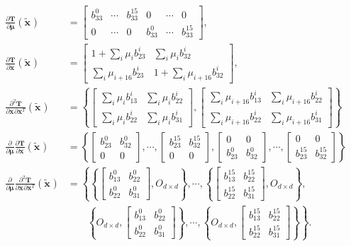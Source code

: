 \documentclass[]{article}
\newcommand{\vT}{\bm{T}}
\newcommand{\vmu}{\bm{\mu}}
\newcommand{\vx}[1][]{\bm{x}_{#1}}
\newcommand{\vxt}[1][]{\bm{\widetilde x}_{#1}}
\newcommand{\D}[2]{\frac{\partial #1}{\partial #2}}
\newcommand{\Dd}[3]{\frac{\partial^2 #1}{\partial #2 \partial #3}}
\begin{document}
\begin{align}
\D{\vT}{\vmu}(\vxt) &= \begin{bmatrix} b_{33}^{0} & \cdots &
b_{33}^{15} & 0 & \cdots & 0 \\ 0 & \cdots & 0 & b_{33}^{0} &
\cdots & b_{33}^{15} \end{bmatrix}, \\
\D{\vT}{\vx}(\vxt) &= \begin{bmatrix} 1 + \sum_i \mu_i b_{23}^i &
\sum_i \mu_i b_{32}^i \\ \sum_i \mu_{i+16} b_{23}^{i} & 1 + \sum_i
\mu_{i+16} b_{32}^{i} \end{bmatrix}, \\
\Dd{\vT}{\vx}{\vx^T}(\vxt) &= \left\{ \begin{bmatrix} \sum_i \mu_i
b_{13}^i & \sum_i \mu_i b_{22}^i \\ \sum_i \mu_{i} b_{22}^{i} &
\sum_i \mu_{i} b_{31}^{i} \end{bmatrix}, \begin{bmatrix} \sum_i
\mu_{i+16} b_{13}^{i} & \sum_i \mu_{i+16} b_{22}^{i} \\ \sum_i
\mu_{i+16} b_{22}^{i} & \sum_i \mu_{i+16} b_{31}^{i}
\end{bmatrix} \right\} \\
\D{}{\vmu} \D{\vT}{\vx}(\vxt) &= \left\{ \begin{bmatrix} b_{23}^{0}
& b_{32}^{0} \\ 0 & 0 \end{bmatrix}, \cdots, \begin{bmatrix}
b_{23}^{15} & b_{32}^{15} \\ 0 & 0 \end{bmatrix}, \begin{bmatrix} 0
& 0 \\ b_{23}^{0} & b_{32}^{0} \end{bmatrix}, \cdots,
\begin{bmatrix} 0 & 0 \\ b_{23}^{15} & b_{32}^{15} \end{bmatrix} \right\}
\\
\D{}{\vmu} \Dd{\vT}{\vx}{\vx^T}(\vxt) &= \left\{ \left\{
\begin{bmatrix} b_{13}^0 & b_{22}^0 \\ b_{22}^0 & b_{31}^0 \end{bmatrix},
O_{d \times d} \right\}, \cdots, \left\{ \begin{bmatrix} b_{13}^{15}
& b_{22}^{15} \\ b_{22}^{15} & b_{31}^{15} \end{bmatrix}, O_{d
\times d} \right\}, \right. \\
& \qquad \left. \left\{ O_{d \times d},
\begin{bmatrix} b_{13}^{0} & b_{22}^{0} \\ b_{22}^{0} &
b_{31}^{0} \end{bmatrix} \right\}, \cdots, \left\{ O_{d \times d},
\begin{bmatrix} b_{13}^{15} & b_{22}^{15} \\ b_{22}^{15} &
b_{31}^{15} \end{bmatrix} \right\} \right\}.
\end{align}
\end{document}
